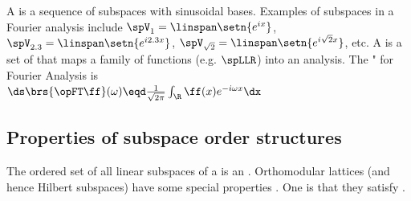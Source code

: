 \begin{example}
A  is a sequence of subspaces with sinusoidal bases.
  Examples of subspaces in a Fourier analysis include $\spV_1=\linspan\setn{e^{ix}}$,
  $\spV_{2.3}=\linspan\setn{e^{i2.3x}}$, $\spV_{\sqrt{2}}=\linspan\setn{e^{i\sqrt{2}x}}$, etc.
  A  is a set of  that maps a family of functions (e.g. $\spLLR$)
  into an analysis.
  The " for Fourier Analysis is 
  \\\indentx$\ds\brs{\opFT\ff}(\omega) \eqd \frac{1}{\sqrt{2\pi}} \int_\R \ff(x) e^{-i\omega x} \dx$
\end{example}



\subsection{Properties of subspace order structures}
The ordered set of all linear subspaces of a  is an .
Orthomodular lattices (and hence Hilbert subspaces) have some special properties .
One is that they satisfy .

